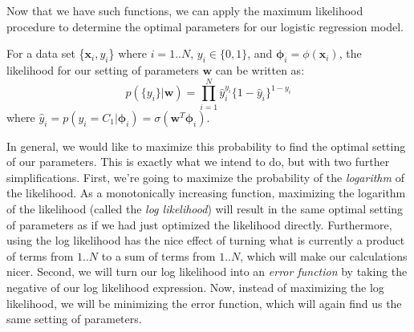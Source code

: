Now that we have such functions, we can apply the maximum likelihood procedure to determine the optimal parameters for our logistic regression model.

For a data set \{$\textbf{x}_{i}, y_{i}$\} where $i = 1..N$, $y_{i} \in \{0,1\}$, and $\boldsymbol{\phi}_{i} = \phi{(\textbf{x}_{i})}$, the likelihood for our setting of parameters $\textbf{w}$ can be written as:
\begin{equation} \label{log-reg-likelihood}
	p(\{y_{i}\}|\textbf{w}) = \prod_{i=1}^{N} \hat{y}_{i}^{y_{i}} \{1 - \hat{y}_{i}\}^{1 - y_{i}}
\end{equation}
where $\hat{y}_{i} = p(y_{i}=C_{1}|\boldsymbol{\phi}_{i}) = \sigma(\textbf{w}^{T}\boldsymbol{\phi}_{i})$.

In general, we would like to maximize this probability to find the optimal setting of our parameters. This is exactly what we intend to do, but with two further simplifications. First, we're going to maximize the probability of the \textit{logarithm} of the likelihood. As a monotonically increasing function, maximizing the logarithm of the likelihood (called the \textit{log likelihood}) will result in the same optimal setting of parameters as if we had just optimized the likelihood directly. Furthermore, using the log likelihood has the nice effect of turning what is currently a product of terms from $1..N$ to a sum of terms from $1..N$, which will make our calculations nicer. Second, we will turn our log likelihood into an \textit{error function} by taking the negative of our log likelihood expression. Now, instead of maximizing the log likelihood, we will be minimizing the error function, which will again find us the same setting of parameters.


